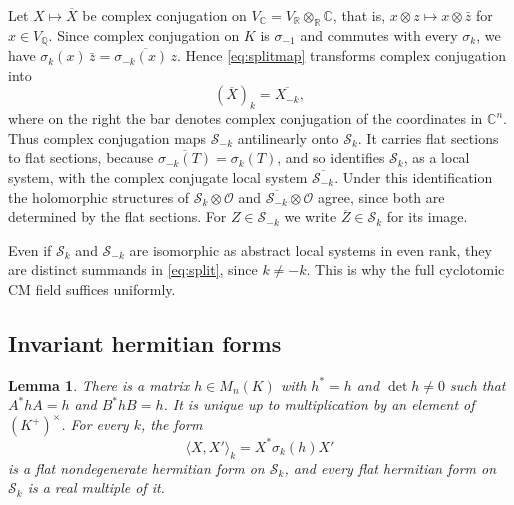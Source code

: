 \documentclass[11pt]{amsart}
\newtheorem{lemma}[theorem]{Lemma}
\theoremstyle{definition}
\theoremstyle{remark}
\numberwithin{equation}{section}
\newcommand{\Q}{\mathbb{Q}}
\newcommand{\C}{\mathbb{C}}
\newcommand{\R}{\mathbb{R}}
\newcommand{\cS}{\mathcal{S}}
\newcommand{\cO}{\mathcal{O}}
\begin{document}
Let $X\mapsto\overline X$ be complex conjugation on $V_\C=V_\R\otimes_\R\C$, that is, $x\otimes z\mapsto x\otimes\bar z$ for $x\in V_\Q$. Since complex conjugation on $K$ is $\sigma_{-1}$ and commutes with every $\sigma_k$, we have $\sigma_k(x)\,\bar z=\overline{\sigma_{-k}(x)\,z}$. Hence \eqref{eq:splitmap} transforms complex conjugation into
\begin{equation}\label{eq:conj}
(\overline X)_k=\overline{X_{-k}} ,
\end{equation}
where on the right the bar denotes complex conjugation of the coordinates in $\C^n$. Thus complex conjugation maps $\cS_{-k}$ antilinearly onto $\cS_k$. It carries flat sections to flat sections, because $\overline{\sigma_{-k}(T)}=\sigma_k(T)$, and so identifies $\cS_k$, as a local system, with the complex conjugate local system $\overline{\cS_{-k}}$. Under this identification the holomorphic structures of $\cS_k\otimes\cO$ and $\overline{\cS_{-k}}\otimes\cO$ agree, since both are determined by the flat sections. For $Z\in\cS_{-k}$ we write $\overline Z\in\cS_k$ for its image.

Even if $\cS_k$ and $\cS_{-k}$ are isomorphic as abstract local systems in even rank, they are distinct summands in \eqref{eq:split}, since $k\ne-k$. This is why the full cyclotomic CM field suffices uniformly.

\subsection{Invariant hermitian forms}
\begin{lemma}\label{lem:herm}
There is a matrix $h\in M_n(K)$ with $h^*=h$ and $\det h\ne0$ such that $A^*hA=h$ and $B^*hB=h$. It is unique up to multiplication by an element of $(K^+)^\times$. For every $k$, the form
\[
\langle X,X'\rangle_k=X^*\sigma_k(h)X'
\]
is a flat nondegenerate hermitian form on $\cS_k$, and every flat hermitian form on $\cS_k$ is a real multiple of it.
\end{lemma}
\end{document}
